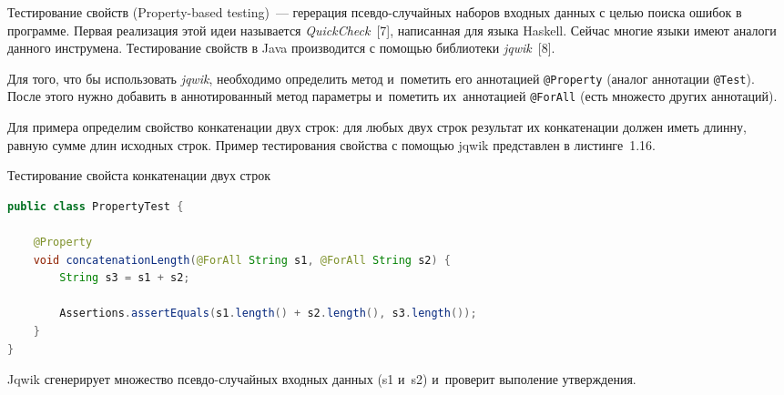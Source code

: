 Тестирование свойств (Property-based testing)~--- герерация псевдо-случайных наборов входных данных с целью поиска ошибок в программе. Первая реализация этой идеи называется \textit{QuickCheck}~[7], написанная для языка Haskell. Сейчас многие языки имеют аналоги данного инструмена. Тестирование свойств в Java производится с помощью библиотеки \textit{jqwik}~[8].

Для того, что бы использовать \textit{jqwik}, необходимо определить метод и~пометить его аннотацией \texttt{@Property} (аналог аннотации \texttt{@Test}). После этого нужно добавить в аннотированный метод параметры и~пометить их~аннотацией \texttt{@ForAll} (есть множесто других аннотаций). 

Для примера определим свойство конкатенации двух строк: для любых двух строк результат их конкатенации должен иметь длинну, равную сумме длин исходных строк. Пример тестирования свойства с помощью jqwik представлен в листинге~1.16.

\begin{ListingEnv}[!h]%
	\captiondelim{ } %
	\caption{Тестирование свойста конкатенации двух строк}
	\begin{lstlisting}[language={Java}]
public class PropertyTest {
	
	@Property
	void concatenationLength(@ForAll String s1, @ForAll String s2) {
		String s3 = s1 + s2;
		
		Assertions.assertEquals(s1.length() + s2.length(), s3.length());
	}
}
	\end{lstlisting}
\end{ListingEnv}%

Jqwik сгенерирует множество псевдо-случайных входных данных (s1 и~s2) и~проверит выполение утверждения.
